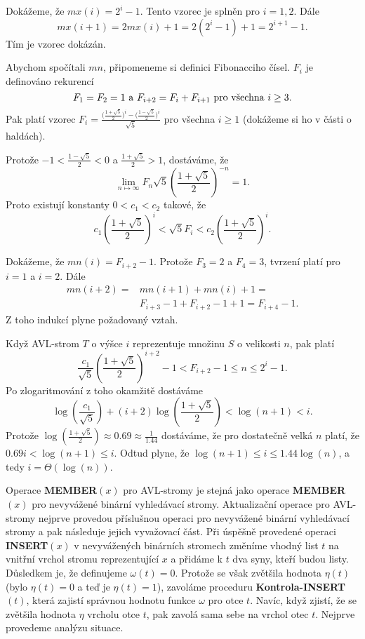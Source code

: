 \documentclass[a4paper,12pt]{article}
\def \emph#1{\underbar{#1}}
\begin{document}
Dokážeme, že $mx(i)=2^i-1$. Tento vzorec je 
splněn pro $i=1,2$. Dále 
$$mx(i+1)=2mx(i)+1=2(2^i-1)+1=2^{i+1}-1.$$
Tím je vzorec dokázán. 

Abychom spočítali $mn$, připomeneme si definici Fibonacciho čísel. \emph{Fibonacciho} 
\emph{číslo} $F_i$ je definováno rekurencí
$$F_1=F_2=1\text{\rm\ a }F_{i+2}=F_i+F_{i+1}\text{\rm\ pro všechna }
i\ge 3.$$
Pak platí vzorec $F_i=\frac {\big(\frac {1+\sqrt 5}2\big)^i-\big
(\frac {1-\sqrt 5}2\big)^i}{\sqrt 5}$ pro všechna $i\ge 1$ 
(dokážeme si ho v části o haldách). 

Protože 
$-1<\frac {1-\sqrt 5}2<0$ a $\frac {1+\sqrt 5}2>1$, dostáváme, že 
$$\lim_{n\mapsto\infty}F_n\sqrt 5(\frac {1+\sqrt 5}2)^{-n}=1.$$
Proto existují konstanty $0<c_1<c_2$ takové, že 
$$c_1(\frac {1+\sqrt 5}2)^i<\sqrt 5F_i<c_2(\frac {1+\sqrt 5}2)^i.$$

Dokážeme, že $mn(i)=F_{i+2}-1$. Protože $F_3
=2$ a 
$F_4=3$, 
tvrzení platí pro $i=1$ a $i=2$. Dále 
\begin{align*} mn(i+2)=&mn(i+1)+mn(i)+1=\\&F_{i+3}-1+F_{i+2}-1+1=F_{i+4}-1.\end{align*}
Z toho indukcí plyne požadovaný vztah. 

Když AVL-strom $T$ o výšce $i$ reprezentuje množinu $
S$ o 
velikosti $n$, pak platí 
$$\frac {c_1}{\sqrt 5}(\frac {1+\sqrt 5}2)^{i+2}-1<F_{i+2}-1\le n
\le 2^i-1.$$
Po zlogaritmování z toho okamžitě dostáváme
$$\log(\frac {c_1}{\sqrt 5})+(i+2)\log(\frac {1+\sqrt 5}2)<\log(n
+1)<i.$$
Protože $\log(\frac {1+\sqrt 5}2)\approx 0.69\approx\frac 1{1.
44}$ dostáváme, že pro dostatečně velká $n$ 
platí, že $0.69i<\log(n+1)\le i$. Odtud plyne, že 
$\log(n+1)\le i\le 1.44\log(n)$, a tedy $i=\Theta (\log(n))$.

Operace {\bf MEMBER$(x)$} pro AVL-stromy je stejná jako 
ope\-race {\bf MEMBER$(x)$} pro nevy\-vá\-žené binární vyhledávací 
stro\-my. Aktualizační operace pro AVL-stromy nejprve provedou 
příslušnou ope\-raci pro nevyvážené binární vyhledávací stromy 
a pak násle\-du\-je jejich vyvažovací část. Při úspěšně 
provedené operaci {\bf IN\-SERT$(x)$} v nevyvážených binárních 
stromech změníme vhod\-ný list $t$ na vnitřní vrchol 
stromu reprezentující $x$ a přidáme k $t$ dva syny, kteří 
budou listy. Důsledkem je, že definujeme 
$\omega (t)=0$. Protože se však zvětšila hodnota $\eta 
(t)$ (bylo 
$\eta (t)=0$ a teď je $\eta (t)=1$), zavoláme proceduru 
{\bf Kontrola-INSERT$(t)$}, která zajistí správnou hodnotu 
funkce $\omega$ pro otce $t$. Navíc, když zjistí, že se zvětšila 
hodnota $\eta$ vrcholu otce $t$, pak zavolá sama sebe na vrchol 
otec $t$. Nejprve provedeme analýzu situace. 
\end{document}

